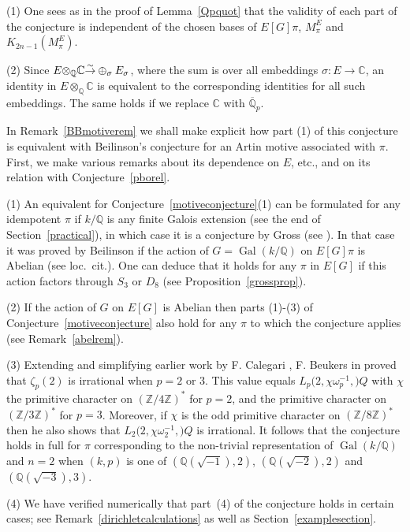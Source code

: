 \documentclass{amsart}
\begin{document}
\begin{remark}\label{newremark}
(1)
One sees as in the proof of Lemma~\ref{Qpquot} that the validity of each part of the conjecture is independent of
the chosen bases of $ E[G]\pi $, $ M_\pi^E $ and $ {{K_{2n-1}(M_\pi^E)}}$.

(2)
Since $ E{\otimes}_{\mathbb Q} {\mathbb C} {\buildrel{\sim}\over{\rightarrow}} \oplus_{\sigma} E_{\sigma} $, where the sum is over all embeddings $ {\sigma} : E \to {\mathbb C} $,
an identity in $ E {\otimes}_{\mathbb Q} {\mathbb C} $ is equivalent to the corresponding identities for all such embeddings.
The same holds if we replace $ {\mathbb C} $ with $ {{\overline {\mathbb Q}_p}} $.
\end{remark}

In Remark~\ref{BBmotiverem} we shall make explicit how part (1) of this conjecture is equivalent with Beilinson's
conjecture \cite[Conjecture~3.4]{bei85} for an Artin motive associated with $ \pi $.
First, we make various remarks about its dependence
on $ E $, etc., and on its relation with Conjecture~\ref{pborel}.

\begin{remark}\label{newrem}
(1)
An equivalent for Conjecture~\ref{motiveconjecture}(1) can be formulated for any idempotent $ \pi $ if $ k/{\mathbb Q} $ is any
finite Galois extension (see the end of Section~\ref{practical}),
in which case it is a conjecture by Gross (see \cite[p.~210]{Neu88}).
In that case it was proved by Beilinson if the action of $ G={\operatorname{Gal}}(k/{\mathbb Q}) $ on $ E[G]\pi $
is Abelian (see loc.\ cit.).  One can deduce that it holds for any $ \pi $ in $ E[G] $ if this action factors through
$ S_3 $ or $ D_8 $ (see Proposition~\ref{grossprop}).

(2)
If the action of $ G $ on $ E[G] $ is Abelian then parts (1)-(3) of Conjecture~\ref{motiveconjecture}
also hold for any $ \pi $ to which the conjecture applies (see Remark~\ref{abelrem}).

(3) Extending and simplifying earlier work by F. Calegari \cite{Cal05}, F. Beukers in \cite{Beu06}
proved that $  {\zeta}_p(2) $ is irrational when $ p=2 $ or 3.  This value equals $ {L_{p}(2,\chi\omega_p^{-1},{\mathbb)}Q} $
with $ \chi $ the primitive character on $ ({\mathbb Z}/4{\mathbb Z})^* $ for $ p=2 $, and the primitive character on $ ({\mathbb Z}/3{\mathbb Z})^* $ for $ p=3 $.
Moreover, if $ \chi $ is the odd primitive character on $ ({\mathbb Z}/8{\mathbb Z})^* $ then he also shows that $ {L_{2}(2,\chi\omega_2^{-1},{\mathbb)}Q} $ is irrational.
It follows that the conjecture holds in full for $ \pi $ corresponding to the non-trivial representation
of $ {\operatorname{Gal}}(k/{\mathbb Q}) $ and $ n=2 $ when
$ (k,p) $ is one of $ ({\mathbb Q}(\sqrt{-1}),2) $, $ ({\mathbb Q}(\sqrt{-2}),2) $ and $ ({\mathbb Q}(\sqrt{-3}),3) $.

(4) We have verified numerically that part~(4) of the conjecture holds in certain cases;
see Remark~\ref{dirichletcalculations} as well as Section~\ref{examplesection}.
\end{remark}
\end{document}
